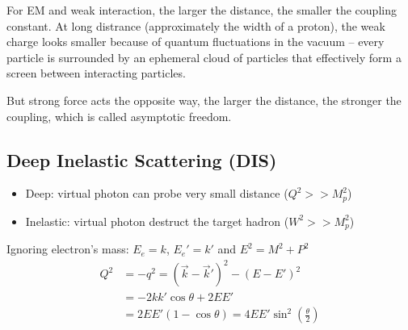 For EM and weak interaction, the larger the distance, the smaller the coupling
constant. At long distrance (approximately the width of a proton), the weak charge 
looks smaller because of quantum fluctuations in the vacuum -- every particle is 
surrounded by an ephemeral cloud of particles that effectively form a screen 
between interacting particles.

But strong force acts the opposite way, the larger the distance, the stronger 
the coupling, which is called asymptotic freedom.

\subsection{Deep Inelastic Scattering (DIS)}
\begin{itemize}
    \item Deep: virtual photon can probe very small distance ($Q^2 >> M^2_p$)
    \item Inelastic: virtual photon destruct the target hadron ($W^2 >> M_p^2$)
\end{itemize}

\begin{figure}[h]
    \centering
\end{figure}
Ignoring electron's mass: $E_e = k$, $E_e' = k'$ and $E^2 = M^2 + P^2$
\begin{equation*}
    \begin{aligned}
	Q^2 &= -q^2 = (\vec{k} - \vec{k}')^2 - (E-E')^2	\\
	    &= -2kk'\cos\theta + 2EE' \\
	    &= 2EE'(1-\cos\theta) = 4EE'\sin^2\left(\frac{\theta}{2}\right)
    \end{aligned}
\end{equation*}

